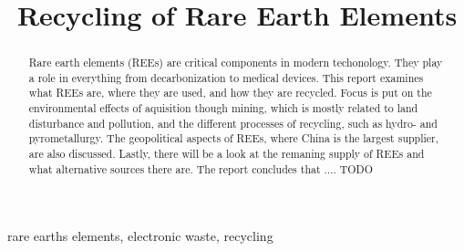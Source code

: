 \documentclass[conference]{IEEEtran}
\begin{document}
\title{Recycling of Rare Earth Elements}

\author{
}

\maketitle

\begin{abstract}
    Rare earth elements (REEs) are critical components in modern techonology. They play a role in everything from decarbonization to medical devices. This report examines what REEs are, where they are used, and how they are recycled. Focus is put on the environmental effects of aquisition though mining, which is mostly related to land disturbance and pollution, and the different processes of recycling, such as hydro- and pyrometallurgy. The geopolitical aspects of REEs, where China is the largest supplier, are also discussed. Lastly, there will be a look at the remaning supply of REEs and what alternative sources there are. The report concludes that .... TODO
\end{abstract}

\begin{IEEEkeywords}
rare earths elements, electronic waste, recycling
\end{IEEEkeywords}















\printbibliography
\end{document}

